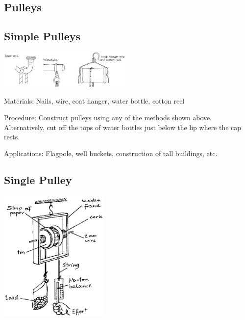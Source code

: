 \begin{multicols}{2}

\section*{Pulleys}


\subsection{Simple Pulleys}
\label{sub:pulleys}

\begin{center}
\includegraphics[width=0.49\textwidth]{./img/vso/pulleys.png}
\end{center}

\begin{description*}
\item[Materials:]{Nails, wire, coat hanger, water bottle, cotton reel}
\item[Procedure:]{Construct pulleys using any of the methods shown above. Alternatively, cut off the tops of water bottles just below the lip where the cap rests.}
\item[Applications:]{Flagpole, well buckets, construction of tall buildings, etc.}
\end{description*}

\subsection{Single Pulley}

\begin{center}
\includegraphics[width=0.4\textwidth]{./img/source/single-pulley.png}
\end{center}


\end{multicols}
